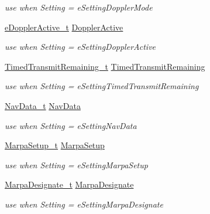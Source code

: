 \begin{DoxyCompactItemize}
\begin{DoxyCompactList}\small\item\em use when \textquotesingle{}Setting\textquotesingle{} = e\+Setting\+Doppler\+Mode \end{DoxyCompactList}\item 
\mbox{\hyperlink{namespace_quantum_lib_a7a034f49c93f16195096c2ecf89432d4}{e\+Doppler\+Active\+\_\+t}} \mbox{\hyperlink{union_quantum_lib_1_1_setting_data__t_1_1_value__t_a660bedb671166a04291d7ea4810f3a3e}{Doppler\+Active}}
\begin{DoxyCompactList}\small\item\em use when \textquotesingle{}Setting\textquotesingle{} = e\+Setting\+Doppler\+Active \end{DoxyCompactList}\item 
\mbox{\hyperlink{struct_quantum_lib_1_1_timed_transmit_remaining__t}{Timed\+Transmit\+Remaining\+\_\+t}} \mbox{\hyperlink{union_quantum_lib_1_1_setting_data__t_1_1_value__t_abff0044814f494778d55038889d10f2a}{Timed\+Transmit\+Remaining}}
\begin{DoxyCompactList}\small\item\em use when \textquotesingle{}Setting\textquotesingle{} = e\+Setting\+Timed\+Transmit\+Remaining \end{DoxyCompactList}\item 
\mbox{\hyperlink{struct_quantum_lib_1_1_nav_data__t}{Nav\+Data\+\_\+t}} \mbox{\hyperlink{union_quantum_lib_1_1_setting_data__t_1_1_value__t_ac1609f72c2ff12ee80c859462176eccd}{Nav\+Data}}
\begin{DoxyCompactList}\small\item\em use when \textquotesingle{}Setting\textquotesingle{} = e\+Setting\+Nav\+Data \end{DoxyCompactList}\item 
\mbox{\hyperlink{struct_quantum_lib_1_1_marpa_setup__t}{Marpa\+Setup\+\_\+t}} \mbox{\hyperlink{union_quantum_lib_1_1_setting_data__t_1_1_value__t_a21e8a1ba3f64344ede717a62586fd23b}{Marpa\+Setup}}
\begin{DoxyCompactList}\small\item\em use when \textquotesingle{}Setting\textquotesingle{} = e\+Setting\+Marpa\+Setup \end{DoxyCompactList}\item 
\mbox{\hyperlink{struct_quantum_lib_1_1_marpa_designate__t}{Marpa\+Designate\+\_\+t}} \mbox{\hyperlink{union_quantum_lib_1_1_setting_data__t_1_1_value__t_a9c31b31355bc6fb21612fba765f7503a}{Marpa\+Designate}}
\begin{DoxyCompactList}\small\item\em use when \textquotesingle{}Setting\textquotesingle{} = e\+Setting\+Marpa\+Designate \end{DoxyCompactList}\item 

\end{DoxyCompactItemize}
